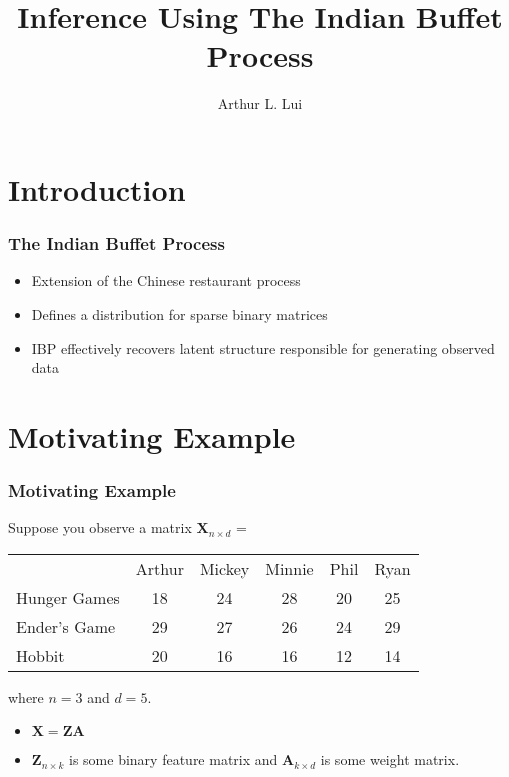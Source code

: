 \documentclass{beamer}
\title{Inference Using The Indian Buffet Process}
\author[Arthur Lui]{Arthur L. Lui}
\institute[Brigham Young University]{
  Department of Statistics\\
  Brigham Young University
}
\def\wl{\par \vspace{\baselineskip}}
\begin{document}
  
  \frame{\titlepage}

  \section{Introduction}
  \begin{frame}
  \frametitle{The Indian Buffet Process}
    \begin{itemize}
      \item Extension of the Chinese restaurant process
      \item Defines a distribution for sparse binary matrices
      \item IBP effectively recovers latent structure responsible for generating 
            observed data
    \end{itemize}
  \end{frame}

  \section{Motivating Example}
  \begin{frame}
  \frametitle{Motivating Example}
     Suppose you observe a matrix $\bm X_{n \times d}$ = \wl

       \begin{tabular}{l|c|c|c|c|c|}
         \multicolumn{1}{c}{}
           & \multicolumn{1}{c}{Arthur} 
           & \multicolumn{1}{c}{Mickey} 
           & \multicolumn{1}{c}{Minnie}
           & \multicolumn{1}{c}{Phil} 
           & \multicolumn{1}{c}{Ryan} \\ 
         \cline{2-6}

         Hunger Games & 18 & 24 & 28 & 20 & 25 \\ \cline{2-6}
         Ender's Game & 29 & 27 & 26 & 24 & 29 \\ \cline{2-6}
         Hobbit       & 20 & 16 & 16 & 12 & 14 \\ \cline{2-6}
       \end{tabular}

       \wl\noindent
       where $n=3$ and $d=5$.
       \begin{itemize}
         \item $\bm X = \bm Z \bm A$ \\
         \item $\bm Z_{n \times k}$ is some binary feature matrix and 
               $\bm A_{k \times d}$ is some weight matrix.
       \end{itemize}
  \end{frame}
  
\end{document}
